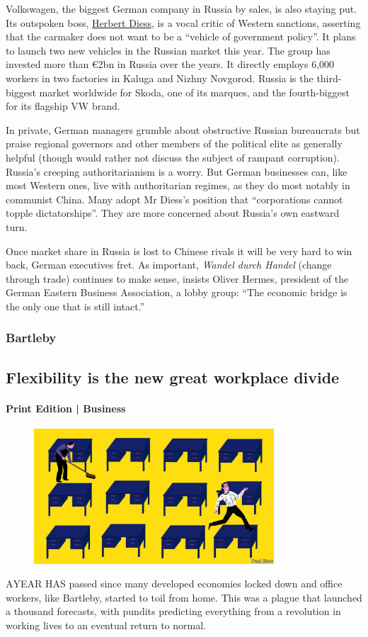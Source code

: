 \documentclass{article}
\begin{document}
Volkswagen, the biggest German company in Russia by sales, is also staying put. Its outspoken boss, \href{/node/21799708}{Herbert Diess}, is a vocal critic of Western sanctions, asserting that the carmaker does not want to be a ``vehicle of government policy''. It plans to launch two new vehicles in the Russian market this year. The group has invested more than €2bn in Russia over the years. It directly employs 6,000 workers in two factories in Kaluga and Nizhny Novgorod. Russia is the third-biggest market worldwide for Skoda, one of its marques, and the fourth-biggest for its flagship VW brand. 

In private, German managers grumble about obstructive Russian bureaucrats but praise regional governors and other members of the political elite as generally helpful (though would rather not discuss the subject of rampant corruption). Russia's creeping authoritarianism is a worry. But German businesses can, like most Western ones, live with authoritarian regimes, as they do most notably in communist China. Many adopt Mr Diess's position that ``corporations cannot topple dictatorships''. They are more concerned about Russia's own eastward turn. 

Once market share in Russia is lost to Chinese rivals it will be very hard to win back, German executives fret. As important, \emph{Wandel durch Handel} (change through trade) continues to make sense, insists Oliver Hermes, president of the German Eastern Business Association, a lobby group: ``The economic bridge is the only one that is still intact.'' {} 
\clearpage
\subsubsection{Bartleby }
\subsection{Flexibility is the new great workplace divide }
\paragraph{Print Edition | Business  \quad \color{gray}{Mar 25th 2021 }}
\begin{figure}[h]
\centering
\includegraphics[width=0.8\textwidth]{images/20210327_WBD001_0.jpg}
\end{figure}
\lettrine{A} YEAR HAS passed since many developed economies locked down and office workers, like Bartleby, started to toil from home. This was a plague that launched a thousand forecasts, with pundits predicting everything from a revolution in working lives to an eventual return to normal. 
\end{document}
